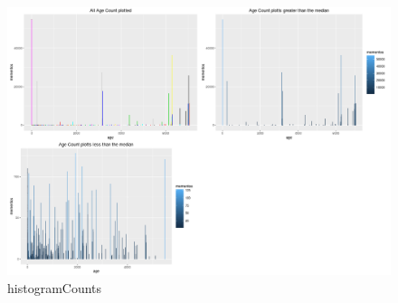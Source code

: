\documentclass[letterpaper,10pt]{article}
\begin{document}
\begin{figure}[!ht]
\includegraphics[scale=0.4]{images/ageCount.png}
\caption{histogramCounts}
\label{fig:bt2}
\end{figure}
  


        
\end{document}
